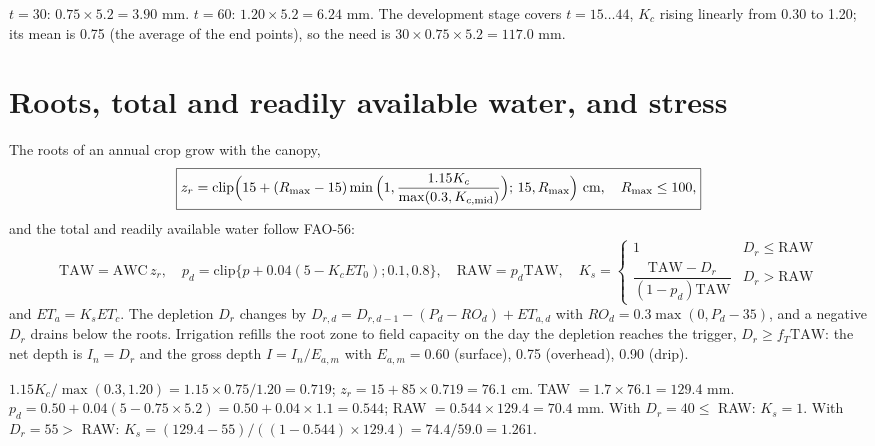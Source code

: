 \sol  $t=30$: $0.75\times5.2=3.90$ mm. $t=60$: $1.20\times5.2=6.24$ mm. The development stage covers $t=15\ldots44$, $K_c$ rising linearly from 0.30 to 1.20; its mean is 0.75 (the average of the end points), so the need is $30\times0.75\times5.2=117.0$ mm.


\section{Roots, total and readily available water, and stress}
The roots of an annual crop grow with the canopy,
\begin{equation}\boxed{z_r=\mathrm{clip}\Big(15+(R_{\max}-15)\min\Big(1,\frac{1.15K_c}{\max(0.3,K_{c,\rm mid})}\Big);\,15,R_{\max}\Big)\ \text{cm},\quad R_{\max}\le100,}\end{equation}
and the total and readily available water follow FAO-56:
\begin{equation}\mathrm{TAW}=\mathrm{AWC}\,z_r,\quad p_d=\mathrm{clip}\{p+0.04(5-K_cET_0);0.1,0.8\},\quad \mathrm{RAW}=p_d\mathrm{TAW},\quad K_s=\begin{cases}1&D_r\le\mathrm{RAW}\\\dfrac{\mathrm{TAW}-D_r}{(1-p_d)\mathrm{TAW}}&D_r>\mathrm{RAW}\end{cases}\end{equation}
and $ET_a=K_sET_c$. The depletion $D_r$ changes by $D_{r,d}=D_{r,d-1}-(P_d-RO_d)+ET_{a,d}$ with $RO_d=0.3\max(0,P_d-35)$, and a negative $D_r$ drains below the roots. Irrigation refills the root zone to field capacity on the day the depletion reaches the trigger, $D_r\ge f_T\mathrm{TAW}$: the net depth is $I_n=D_r$ and the gross depth $I=I_n/E_{a,m}$ with $E_{a,m}=0.60$ (surface), 0.75 (overhead), 0.90 (drip).

\sol  $1.15K_c/\max(0.3,1.20)=1.15\times0.75/1.20=0.719$; $z_r=15+85\times0.719=76.1$ cm. TAW $=1.7\times76.1=129.4$ mm. $p_d=0.50+0.04(5-0.75\times5.2)=0.50+0.04\times1.1=0.544$; RAW $=0.544\times129.4=70.4$ mm. With $D_r=40\le$ RAW: $K_s=1$. With $D_r=55>$ RAW: $K_s=(129.4-55)/((1-0.544)\times129.4)=74.4/59.0=1.261$.


